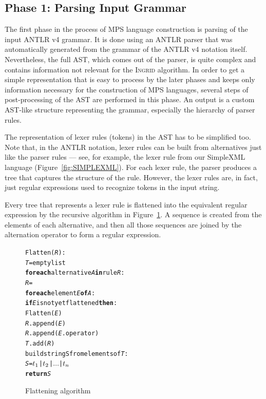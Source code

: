 \subsection{Phase 1: Parsing Input Grammar}

The first phase in the process of MPS language construction is parsing of the input ANTLR v4 grammar.
It is done using an ANTLR parser that was automatically generated from the grammar of the ANTLR v4 notation itself.
Nevertheless, the full AST, which comes out of the parser, is quite complex and contains information not relevant for the \textsc{Ingrid} algorithm.
In order to get a simple representation that is easy to process by the later phases and keeps only information necessary for the construction of MPS languages, several steps of post-processing of the AST are performed in this phase.
An output is a custom AST-like structure representing the grammar, especially the hierarchy of parser rules.

The representation of lexer rules (tokens) in the AST has to be simplified too.
Note that, in the ANTLR notation, lexer rules can be built from alternatives just like the parser rules --- see, for example, the lexer rule  from our SimpleXML language (Figure~\ref{fig:SIMPLEXML}).
For each lexer rule, the parser produces a tree that captures the structure of the rule.
However, the lexer rules are, in fact, just regular expressions used to recognize tokens in the input string.

Every tree that represents a lexer rule is flattened into the equivalent regular expression by the recursive algorithm in Figure~\ref{fig:ALGFLATTEN}.
A sequence is created from the elements of each alternative, and then all those sequences are joined by the alternation operator \code{$|$} to form a regular expression.

\begin{figure}[ht]
\centering
\begin{framed}
\begin{alltt}
\small
Flatten(\textit{R}):
  \textit{T} = empty list
  \textbf{for each} alternative \textit{A} \textbf{in} rule \textit{R}:
    \textit{R} = \antlrap\antlrap
    \textbf{for each} element \textit{E} \textbf{of} \textit{A}:
      \textbf{if} \textit{E} is not yet flattened \textbf{then}:
        Flatten(\textit{E})
      \textit{R}.append(\textit{E})
      \textit{R}.append(\textit{E}.operator)
    \textit{T}.add(\textit{R})
  build string S from elements of \textit{T}:
    \textit{S} = \(t\sb{1}\) | \(t\sb{2}\) | \(\ldots\) | \(t\sb{n}\)
  \textbf{return} \textit{S}
\end{alltt}
\end{framed}
\caption{Flattening algorithm}
\label{fig:ALGFLATTEN}
\end{figure}

